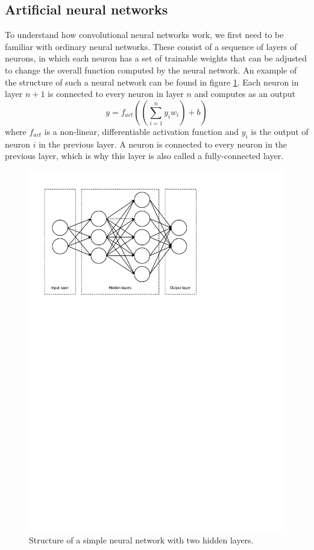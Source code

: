 \documentclass[12pt,a4paper,twoside,openright]{report}
\begin{document}
\subsection{Artificial neural networks}
To understand how convolutional neural networks work, we first need to be familiar with ordinary neural networks. These consist of a sequence of layers of neurons, in which each neuron has a set of trainable weights that can be adjusted to change the overall function computed by the neural network. An example of the structure of such a neural network can be found in figure \ref{fig:nn_layout}. Each neuron in layer $n+1$ is connected to every neuron in layer $n$ and computes as an output
\[y = f_{act}((\sum_{i=1}^{n} y_i w_i) + b)\]
where $f_{act}$ is a non-linear, differentiable activation function and $y_i$ is the output of neuron $i$ in the previous layer. A neuron is connected to every neuron in the previous layer, which is why this layer is also called a fully-connected layer.

\begin{figure}
	\centering
	\includegraphics[scale=0.6]{nn_layout}
	\caption{Structure of a simple neural network with two hidden layers.}
	\label{fig:nn_layout}
\end{figure}
\end{document}

